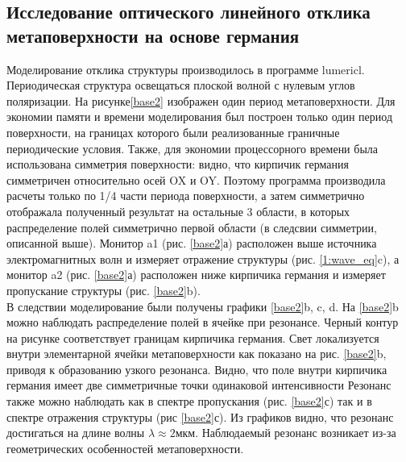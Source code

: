 \subsection{Исследование оптического линейного отклика метаповерхности на основе германия}
\hspace{2mm}
Моделирование отклика структуры производилось в программе lumericl. Периодическая структура освещаться плоской волной с нулевым углов поляризации. На рисунке\ref{base2} изображен один период метаповерхности. Для экономии памяти и времени моделирования был построен только один период поверхности, на границах которого были реализованные граничные периодические условия. Также, для экономии процессорного времени была использована симметрия поверхности: видно, что кирпичик германия симметричен относительно осей OX и OY. Поэтому программа производила расчеты только по 1/4 части  периода поверхности, а затем симметрично отображала полученный результат на остальные 3 области, в которых распределение полей симметрично первой области (в следсвии симметрии, описанной выше).  Монитор a1 (рис.  \ref{base2}а) расположен выше источника электромагнитных волн и измеряет отражение структуры (рис. \ref{1:wave_eq}c), а монитор a2 (рис. \ref{base2}а) расположен ниже кирпичика германия и измеряет пропускание структуры (рис. \ref{base2}b). 
\\
В следствии моделирование были получены графики \ref{base2}b, c, d. На \ref{base2}b можно наблюдать распределение полей в ячейке при резонансе. Черный контур на рисунке соответствует границам кирпичика германия. Свет локализуется внутри элементарной ячейки метаповерхности как показано на рис. \ref{base2}b, приводя к образованию узкого резонанса. Видно, что поле внутри кирпичика германия имеет две симметричные точки одинаковой интенсивности Резонанс также можно наблюдать как в спектре пропускания (рис. \ref{base2}с) так и в спектре отражения структуры (рис \ref{base2}с).  Из графиков видно, что резонанс достигаться на длине волны  $\lambda \approx 2$мкм. Наблюдаемый резонанс возникает из-за геометрических особенностей метаповерхности. 

